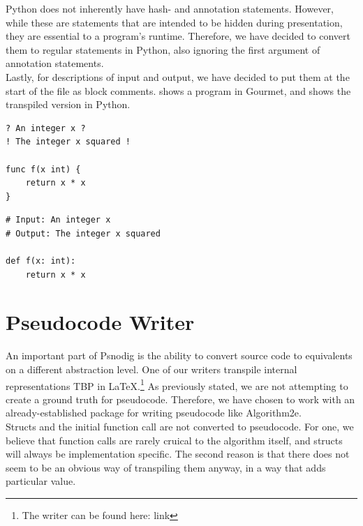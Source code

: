 Python does not inherently have hash- and annotation statements. However, while these are statements that are intended to be hidden during presentation, they are essential to a program's runtime. Therefore, we have decided to convert them to regular statements in Python, also ignoring the first argument of annotation statements. \\

Lastly, for descriptions of input and output, we have decided to put them at the start of the file as block comments.  shows a program in Gourmet, and  shows the transpiled version in Python. \\

\begin{lstlisting}[caption={A Gourmet function where an input variable gets squared and returned.}, captionpos=b, label={gourmetSquareVariable}]
? An integer x ?
! The integer x squared !

func f(x int) {
    return x * x
}
\end{lstlisting}

\begin{lstlisting}[caption={The result of transpiling \Cref{gourmetSquareVariable} to Python with Psnodig}, captionpos=b, label={PythonResult}]
# Input: An integer x 
# Output: The integer x squared 

def f(x: int):
    return x * x
\end{lstlisting}

\section{Pseudocode Writer}

An important part of Psnodig is the ability to convert source code to equivalents on a different abstraction level. One of our writers transpile internal representations TBP in LaTeX.\footnote{The writer can be found here: link} As previously stated, we are not attempting to create a ground truth for pseudocode. Therefore, we have chosen to work with an already-established package for writing pseudocode like Algorithm2e. \\

Structs and the initial function call are not converted to pseudocode. For one, we believe that function calls are rarely cruical to the algorithm itself, and structs will always be implementation specific. The second reason is that there does not seem to be an obvious way of transpiling them anyway, in a way that adds particular value.

